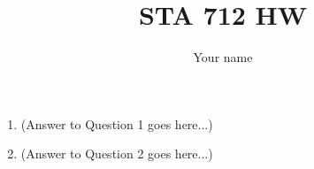 \documentclass[12pt]{article}
\title{STA 712 HW}
\author{Your name}
\date{}
\begin{document}
\maketitle

\begin{enumerate}
\item (Answer to Question 1 goes here...)

\item (Answer to Question 2 goes here...)

\end{enumerate}
\end{document}
